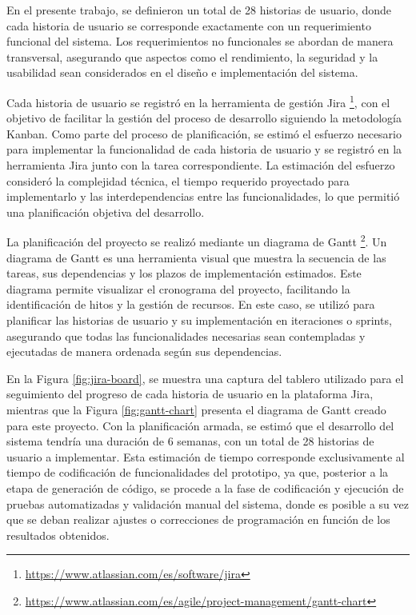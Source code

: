 En el presente trabajo, se definieron un total de 28 historias de usuario, donde cada historia de usuario se corresponde exactamente con un requerimiento funcional del sistema. Los requerimientos no funcionales se abordan de manera transversal, asegurando que aspectos como el rendimiento, la seguridad y la usabilidad sean considerados en el diseño e implementación del sistema.

Cada historia de usuario se registró en la herramienta de gestión Jira \footnote{\url{https://www.atlassian.com/es/software/jira}}, con el objetivo de facilitar la gestión del proceso de desarrollo siguiendo la metodología Kanban. Como parte del proceso de planificación, se estimó el esfuerzo necesario para implementar la funcionalidad de cada historia de usuario y se registró en la herramienta Jira junto con la tarea correspondiente. La estimación del esfuerzo consideró la complejidad técnica, el tiempo requerido proyectado para implementarlo y las interdependencias entre las funcionalidades, lo que permitió una planificación objetiva del desarrollo.

La planificación del proyecto se realizó mediante un diagrama de Gantt \footnote{\url{https://www.atlassian.com/es/agile/project-management/gantt-chart}}. Un diagrama de Gantt es una herramienta visual que muestra la secuencia de las tareas, sus dependencias y los plazos de implementación estimados. Este diagrama permite visualizar el cronograma del proyecto, facilitando la identificación de hitos y la gestión de recursos. En este caso, se utilizó para planificar las historias de usuario y su implementación en iteraciones o sprints, asegurando que todas las funcionalidades necesarias sean contempladas y ejecutadas de manera ordenada según sus dependencias.

En la Figura \ref{fig:jira-board}, se muestra una captura del tablero utilizado para el seguimiento del progreso de cada historia de usuario en la plataforma Jira, mientras que la Figura \ref{fig:gantt-chart} presenta el diagrama de Gantt creado para este proyecto. Con la planificación armada, se estimó que el desarrollo del sistema tendría una duración de 6 semanas, con un total de 28 historias de usuario a implementar. Esta estimación de tiempo corresponde exclusivamente al tiempo de codificación de funcionalidades del prototipo, ya que, posterior a la etapa de generación de código, se procede a la fase de codificación y ejecución de pruebas automatizadas y validación manual del sistema, donde es posible a su vez que se deban realizar ajustes o correcciones de programación en función de los resultados obtenidos.

